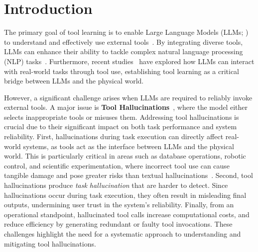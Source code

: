 \section{Introduction}


The primary goal of tool learning is to enable Large Language Models (LLMs; \citealp{geminiteam2023gemini,achiam2023gpt,dubey2024llama}) to understand and effectively use external tools~\cite{qin2024toollearningfoundationmodels}. By integrating diverse tools, LLMs can enhance their ability to tackle complex natural language processing (NLP) tasks~\cite{schick2023toolformer,hao2023toolkengpt, hsieh2023tool, tang2023toolalpaca}. Furthermore, recent studies~\citep{qin2023webcpm, NEURIPS2022_82ad13ec_webshop, cai2024large} have explored how LLMs can interact with real-world tasks through tool use, establishing tool learning as a critical bridge between LLMs and the physical world.

However, a significant challenge arises when LLMs are required to reliably invoke external tools. A major issue is \textbf{Tool Hallucinations}~\citep{patil2023gorilla}, where the model either selects inappropriate tools or misuses them. 
Addressing tool hallucinations is crucial due to their significant impact on both task performance and system reliability. First, hallucinations during task execution can directly affect real-world systems, as tools act as the interface between LLMs and the physical world. This is particularly critical in areas such as database operations, robotic control, and scientific experimentation, where incorrect tool use can cause tangible damage and pose greater risks than textual hallucinations~\citep{ji2023survey}. Second, tool hallucinations produce \textit{task hallucination} that are harder to detect. Since hallucinations occur during task execution, they often result in misleading final outputs, undermining user trust in the system’s reliability. Finally, from an operational standpoint, hallucinated tool calls increase computational costs, and reduce efficiency by generating redundant or faulty tool invocations. These challenges highlight the need for a systematic approach to understanding and mitigating tool hallucinations.

